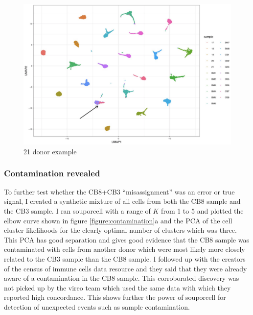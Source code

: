 \begin{figure}[htbp!]
\caption{21 donor example}
\label{figure:21donor}
\begin{centering}

\includegraphics[width=\textwidth]{21donor.png} 
\end{centering}


\end{figure}

\subsubsection{Contamination revealed}

\par{
To further test whether the CB8+CB3 ``misassignment'' was an error or true signal, I created a synthetic mixture of all cells from both the CB8 sample and the CB3 sample. I ran souporcell with a range of $K$ from 1 to 5 and plotted the elbow curve shown in figure \ref{figure:contamination}a and the PCA of the cell cluster likelihoods for the clearly optimal number of clusters which was three. This PCA has good separation and gives good evidence that the CB8 sample was contaminated with cells from another donor which were most likely more closely related to the CB3 sample than the CB8 sample. I followed up with the creators of the census of immune cells data resource and they said that they were already aware of a contamination in the CB8 sample. This corroborated discovery was not picked up by the vireo team which used the same data with which they reported high concordance. This shows further the power of souporcell for detection of unexpected events such as sample contamination.
}

